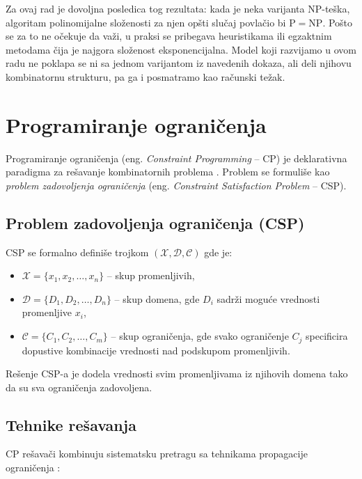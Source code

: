 \documentclass[12pt,oneside]{memoir}
\begin{document}
Za ovaj rad je dovoljna posledica tog rezultata: kada je neka varijanta
NP-teška, algoritam polinomijalne složenosti za njen opšti slučaj
povlačio bi $\mathrm{P} = \mathrm{NP}$. Pošto se za to ne očekuje da
važi, u praksi se pribegava heuristikama ili egzaktnim metodama čija je
najgora složenost eksponencijalna. Model koji razvijamo u ovom radu ne
poklapa se ni sa jednom varijantom iz navedenih dokaza, ali deli
njihovu kombinatornu strukturu, pa ga i posmatramo kao računski težak.

\section{Programiranje ograničenja}
\label{sec:cp}

Programiranje ograničenja (eng. \emph{Constraint Programming} -- CP)
je deklarativna paradigma za rešavanje kombinatornih problema
\cite{rossi2006, apt2003}. Problem se formuliše kao \emph{problem
zadovoljenja ograničenja} (eng. \emph{Constraint Satisfaction
Problem} -- CSP).

\subsection{Problem zadovoljenja ograničenja (CSP)}

CSP se formalno definiše trojkom $(\mathcal{X}, \mathcal{D},
\mathcal{C})$ gde je:

\begin{itemize}
\item $\mathcal{X} = \{x_1, x_2, \ldots, x_n\}$ -- skup promenljivih,
\item $\mathcal{D} = \{D_1, D_2, \ldots, D_n\}$ -- skup domena, gde
  $D_i$ sadrži moguće vrednosti promenljive $x_i$,
\item $\mathcal{C} = \{C_1, C_2, \ldots, C_m\}$ -- skup ograničenja,
  gde svako ograničenje $C_j$ specificira dopustive kombinacije
  vrednosti nad podskupom promenljivih.
\end{itemize}

Rešenje CSP-a je dodela vrednosti svim promenljivama iz njihovih
domena tako da su sva ograničenja zadovoljena.

\subsection{Tehnike rešavanja}

CP rešavači kombinuju sistematsku pretragu sa tehnikama propagacije
ograničenja \cite{rossi2006}:
\end{document}
